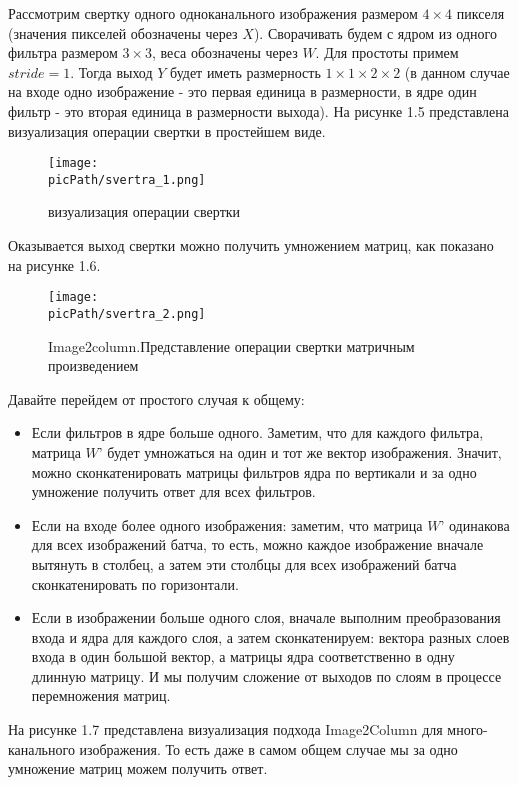 \documentclass[oneside,final,12pt]{extreport}
\newcommand{\picPath}{images}
\begin{document}
Рассмотрим свертку одного одноканального изображения размером $4 \times 4$ пикселя (значения пикселей обозначены через $X$). Сворачивать будем с ядром из одного фильтра размером $3 \times 3$, веса обозначены через $W$. Для простоты примем $stride = 1$. Тогда выход $Y$ будет иметь размерность $1 \times 1 \times 2 \times 2$ (в данном случае на входе одно изображение - это первая единица в размерности, в ядре один фильтр - это вторая единица в размерности выхода). На рисунке 1.5 представлена визуализация операции свертки в простейшем виде.
\begin{figure}[H]
\begin{center}
  \texttt{[image: \\picPath/svertra\_1.png]}
  \caption{ визуализация операции свертки}
  \label{fig:svertra_1}
  \end{center}
\end{figure}
Оказывается выход свертки можно получить умножением матриц, как показано на рисунке 1.6. 
\begin{figure}[H]
\begin{center}
  \texttt{[image: \\picPath/svertra\_2.png]}
  \caption{Image2column.Представление операции свертки матричным произведением}
  \label{fig:svertra_2}
  \end{center}
\end{figure}
Давайте перейдем от простого случая к общему:
\begin{itemize}
\item Если фильтров в ядре больше одного. Заметим, что для каждого фильтра, матрица $W’$ будет умножаться на один и тот же вектор изображения. Значит, можно сконкатенировать матрицы фильтров ядра по вертикали и за одно умножение получить ответ для всех фильтров.
\item Если на входе более одного изображения: заметим, что матрица $W’$ одинакова для всех изображений батча, то есть, можно каждое изображение вначале вытянуть в столбец, а затем эти столбцы для всех изображений батча сконкатенировать по горизонтали.
\item Если в изображении больше одного слоя, вначале выполним преобразования входа и ядра для каждого слоя, а затем сконкатенируем: вектора разных слоев входа в один большой вектор, а матрицы ядра соответственно в одну длинную матрицу. И мы получим сложение от выходов по слоям в процессе перемножения матриц.
\end{itemize}

На рисунке 1.7 представлена визуализация подхода Image2Column для много-канального изображения. То есть даже в самом общем случае мы за одно умножение матриц можем получить ответ.
\end{document}
